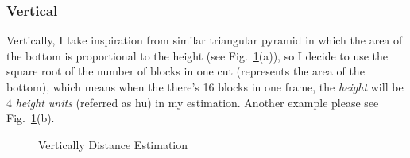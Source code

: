 \documentclass{article}
\begin{document}
\subsubsection{Vertical}

Vertically, I take inspiration from similar triangular pyramid in which the area of the bottom is proportional to the height (see Fig.~\ref{fig:blocksAndPyramid}(a)), so I decide to use the square root of the number of blocks in one cut (represents the area of the bottom), which means when the there's 16 blocks in one frame, the \emph{height} will be $4$ \emph{height units} (referred as hu) in my estimation. Another example please see Fig.~\ref{fig:blocksAndPyramid}(b). 

\begin{figure}[!h]
	\centering
	\hspace{0 pt}
	\caption{Vertically Distance Estimation}
	\label{fig:blocksAndPyramid}
\end{figure}
\end{document}
